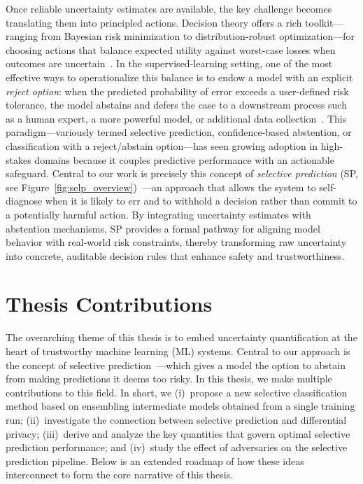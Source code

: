 Once reliable uncertainty estimates are available, the key challenge becomes translating them into principled actions. Decision theory offers a rich toolkit—ranging from Bayesian risk minimization to distribution-robust optimization—for choosing actions that balance expected utility against worst-case losses when outcomes are uncertain~\citep{berger2013statistical,rahimian2022frameworks}. In the supervised-learning setting, one of the most effective ways to operationalize this balance is to endow a model with an explicit \emph{reject option}: when the predicted probability of error exceeds a user-defined risk tolerance, the model abstains and defers the case to a downstream process such as a human expert, a more powerful model, or additional data collection~\citep{bartlett2008classification,geifman2017selective}. This paradigm—variously termed selective prediction, confidence-based abstention, or classification with a reject/abstain option—has seen growing adoption in high-stakes domains because it couples predictive performance with an actionable safeguard. Central to our work is precisely this concept of \textit{selective prediction} (SP, see Figure~\ref{fig:selp_overview})~\citep{chow1957optimum,el2010foundations}—an approach that allows the system to self-diagnose when it is likely to err and to withhold a decision rather than commit to a potentially harmful action. By integrating uncertainty estimates with abstention mechanisms, SP provides a formal pathway for aligning model behavior with real-world risk constraints, thereby transforming raw uncertainty into concrete, auditable decision rules that enhance safety and trustworthiness.

\vspace{15pt}
\section{Thesis Contributions}
\label{sec:contrib}

The overarching theme of this thesis is to embed uncertainty quantification at the heart of trustworthy machine learning (ML) systems. Central to our approach is the concept of selective prediction~\citep{chow1957optimum,el2010foundations}—which gives a model the option to abstain from making predictions it deems too risky. In this thesis, we make multiple contributions to this field. In short, we (i)~propose a new selective classification method based on ensembling intermediate models obtained from a single training run; (ii)~investigate the connection between selective prediction and differential privacy; (iii)~derive and analyze the key quantities that govern optimal selective prediction performance; and (iv)~study the effect of adversaries on the selective prediction pipeline. Below is an extended roadmap of how these ideas interconnect to form the core narrative of this thesis.

